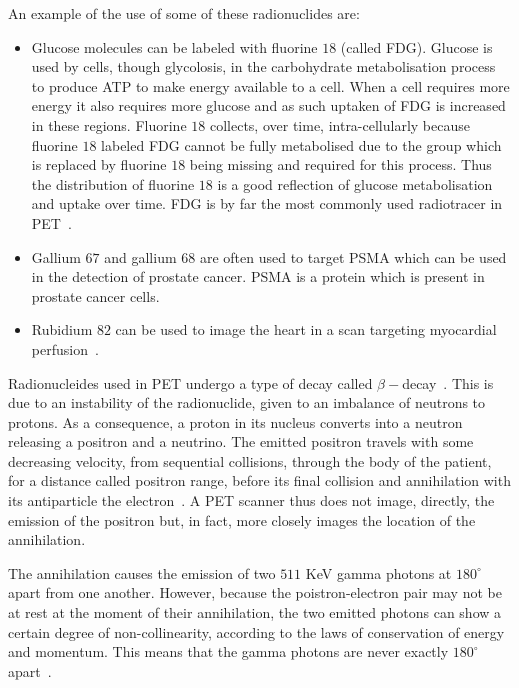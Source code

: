             An example of the use of some of these radionuclides are:
            
            \begin{itemize}
                \item Glucose molecules can be labeled with fluorine $18$ (called \gls{FDG}). Glucose is used by cells, though glycolosis, in the carbohydrate metabolisation process to produce \gls{ATP} to make energy available to a cell. When a cell requires more energy it also requires more glucose and as such uptaken of \gls{FDG} is increased in these regions. Fluorine $18$ collects, over time, intra-cellularly because fluorine $18$ labeled \gls{FDG} cannot be fully metabolised due to the group which is replaced by fluorine $18$ being missing and required for this process. Thus the distribution of fluorine $18$ is a good reflection of glucose metabolisation and uptake over time. \gls{FDG} is by far the most commonly used radiotracer in \gls{PET}~.
                
                \item Gallium $67$ and gallium $68$ are often used to target \gls{PSMA} which can be used in the detection of prostate cancer. \gls{PSMA} is a protein which is present in prostate cancer cells.
                
                \item Rubidium $82$ can be used to image the heart in a scan targeting myocardial perfusion~.
            \end{itemize}
            
            Radionucleides used in \gls{PET} undergo a type of decay called $\beta-$decay~. This is due to an instability of the radionuclide, given to an imbalance of neutrons to protons. As a consequence, a proton in its nucleus converts into a neutron releasing a positron and a neutrino. The emitted positron travels with some decreasing velocity, from sequential collisions, through the body of the patient, for a distance called positron range, before its final collision and annihilation with its antiparticle the electron~. A \gls{PET} scanner thus does not image, directly, the emission of the positron but, in fact, more closely images the location of the annihilation.
            
            The annihilation causes the emission of two $511$ \gls{KeV} gamma photons at $180^{\circ}$ apart from one another. However, because the poistron-electron pair may not be at rest at the moment of their annihilation, the two emitted photons can show a certain degree of non-collinearity, according to the laws of conservation of energy and momentum. This means that the gamma photons are never exactly $180^{\circ}$ apart~.%
            
